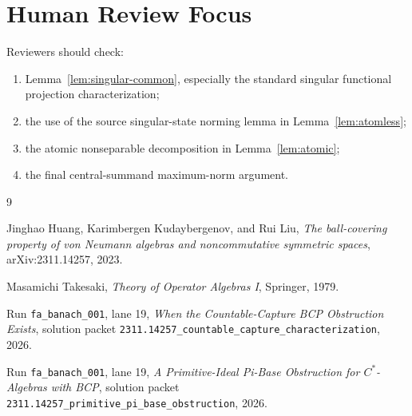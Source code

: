 \documentclass[11pt]{article}
\begin{document}
\section*{Human Review Focus}

Reviewers should check:
\begin{enumerate}
    \item Lemma~\ref{lem:singular-common}, especially the standard singular
          functional projection characterization;
    \item the use of the source singular-state norming lemma in
          Lemma~\ref{lem:atomless};
    \item the atomic nonseparable decomposition in Lemma~\ref{lem:atomic};
    \item the final central-summand maximum-norm argument.
\end{enumerate}

\begin{thebibliography}{9}

Jinghao Huang, Karimbergen Kudaybergenov, and Rui Liu,
\emph{The ball-covering property of von Neumann algebras and noncommutative
symmetric spaces},
arXiv:2311.14257, 2023.

Masamichi Takesaki,
\emph{Theory of Operator Algebras I},
Springer, 1979.

Run \texttt{fa\_banach\_001}, lane 19,
\emph{When the Countable-Capture BCP Obstruction Exists},
solution packet
\texttt{2311.14257\_countable\_capture\_characterization}, 2026.

Run \texttt{fa\_banach\_001}, lane 19,
\emph{A Primitive-Ideal Pi-Base Obstruction for \(C^*\)-Algebras with BCP},
solution packet
\texttt{2311.14257\_primitive\_pi\_base\_obstruction}, 2026.

\end{thebibliography}
\end{document}
